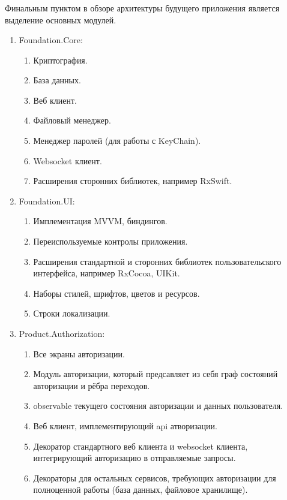 \subsubsection{}
\label{sec:development:arch:ios:modules}

Финальным пунктом в обзоре архитектуры будущего приложения является выделение основных модулей.

\begin{enumerate}
	
	\item Foundation.Core:
	\begin{enumerate}
		\item Криптография.
		\item База данных.
		\item Веб клиент.
		\item Файловый менеджер.
		\item Менеджер паролей (для работы с KeyChain).
		\item Websocket клиент.
		\item Расширения сторонних библиотек, например RxSwift.
	\end{enumerate}

	\item Foundation.UI:
	\begin{enumerate}
		\item Имплементация MVVM, биндингов.
		\item Переиспользуемые контролы приложения.
		\item Расширения стандартной и сторонних библиотек пользовательского интерфейса, например RxCocoa, UIKit.
		\item Наборы стилей, шрифтов, цветов и ресурсов.
		\item Строки локализации.
	\end{enumerate}

	\item Product.Authorization:
	\begin{enumerate}
		\item Все экраны авторизации.
		\item Модуль авторизации, который предсавляет из себя граф состояний авторизации и рёбра переходов.
		\item \gls{observable} текущего состояния авторизации и данных пользователя.
		\item Веб клиент, имплементирующий \gls{api} атворизации.
		\item Декоратор стандартного веб клиента и websocket клиента, интегрирующий авторизацию в отправляемые запросы.
		\item Декораторы для остальных сервисов, требующих авторизации для полноценной работы (база данных, файловое хранилище).
	\end{enumerate}


\end{enumerate}
